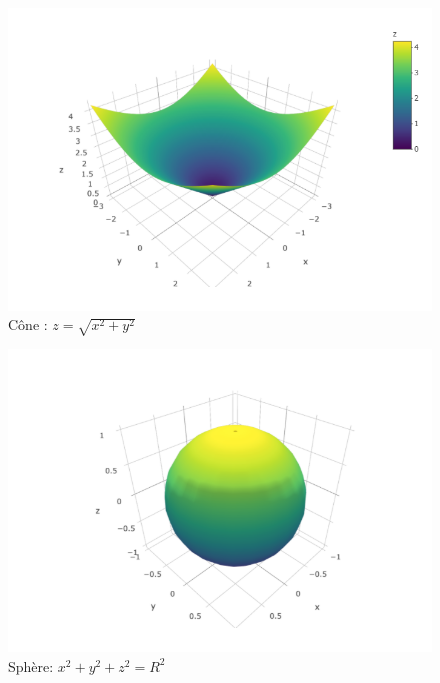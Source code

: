 \documentclass[]{book}
\theoremstyle{definition}
\theoremstyle{definition}
\theoremstyle{definition}
\theoremstyle{remark}
\begin{document}
\begin{figure}

{\centering \includegraphics[width=0.8\linewidth]{resources/images/cone} 

}

\caption{Cône : $z=\sqrt{x^2+y^2}$}\label{fig:cone}
\end{figure}

\begin{figure}

{\centering \includegraphics[width=0.8\linewidth]{resources/images/sphere} 

}

\caption{Sphère: $x^2+y^2+z^2=R^2$}\label{fig:sphere}
\end{figure}
\end{document}
